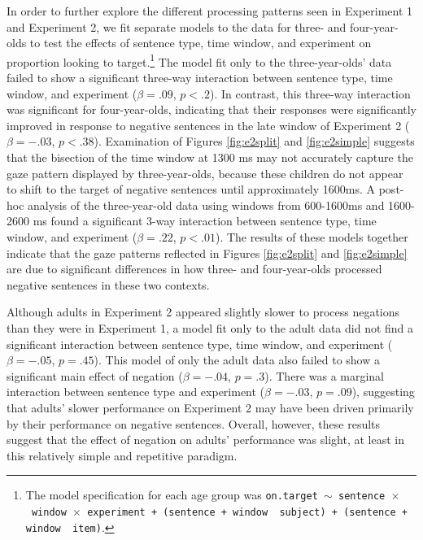 \documentclass[man]{apa2}
\begin{document}
In order to further explore the different processing patterns seen in Experiment 1 and Experiment 2, we fit separate models to the data for three- and four-year-olds to test the effects of sentence type, time window, and experiment on proportion looking to target.\footnote{The model specification for each age group was \texttt{on.target $\sim$ sentence~$\times$~window~$\times$~experiment + (sentence + window~\textbar~subject) +  (sentence + window~\textbar~item)}.} The model fit only to the three-year-olds' data failed to show a significant three-way interaction between sentence type, time window, and experiment  ($\beta = .09$, $p < .2$).  In contrast, this three-way interaction was significant for four-year-olds, indicating that their responses were significantly improved in response to negative sentences in the late window of Experiment 2  ($\beta = -.03$, $p < .38$).  Examination of Figures \ref{fig:e2split} and \ref{fig:e2simple} suggests that the bisection of the time window at 1300 ms may not accurately capture the gaze pattern displayed by three-year-olds, because these children do not appear to shift to the target of negative sentences until approximately 1600ms.  A post-hoc analysis of the three-year-old data using windows from 600-1600ms and 1600-2600 ms found a significant 3-way interaction between sentence type, time window, and experiment ($\beta = .22$, $p < .01$).  The results of these models together indicate that the gaze patterns reflected in Figures \ref{fig:e2split} and \ref{fig:e2simple} are due to significant differences in how three- and four-year-olds processed negative sentences in these two contexts.  

Although adults in Experiment 2 appeared slightly slower to process negations than they were in Experiment 1, a model fit only to the adult data did not find a significant interaction between sentence type, time window, and experiment ($\beta = -.05$, $p = .45$).  This model of only the adult data also failed to show a significant main effect of negation ($\beta = -.04$, $p = .3$).  There was a marginal interaction between sentence type and experiment ($\beta = -.03$, $p = .09$), suggesting that adults' slower performance on Experiment 2 may have been driven primarily by their performance on negative sentences.  Overall, however, these results suggest that the effect of negation on adults' performance was slight, at least in this relatively simple and repetitive paradigm.  
\end{document}
